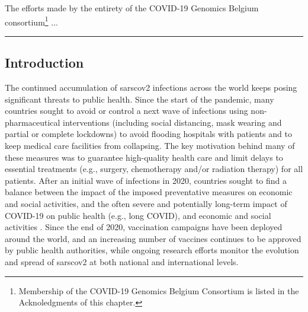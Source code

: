The efforts made by the entirety of the COVID-19 Genomics Belgium consortium\footnote{Membership of the COVID-19 Genomics Belgium Consortium is listed in the Acknoledgments of this chapter.} ...
\vspace*{12pt}
\hrule

\onehalfspacing

\subsection{Introduction}
The continued accumulation of \gls{sarscov2} infections across the world keeps posing significant threats to public health.
Since the start of the pandemic, many countries sought to avoid or control a next wave of infections using non-pharmaceutical interventions (including social distancing, mask wearing and partial or complete lockdowns) to avoid flooding hospitals with patients and to keep medical care facilities from collapsing.
The key motivation behind many of these measures was to guarantee high-quality health care and limit delays to essential treatments (e.g., surgery, chemotherapy and/or radiation therapy) for all patients.
After an initial wave of infections in 2020, countries sought to find a balance between the impact of the imposed preventative measures on economic and social activities, and the often severe and potentially long-term impact of COVID-19 on public health (e.g., long COVID), and economic and social activities \citep{zivin2020spread}.
Since the end of 2020, vaccination campaigns have been deployed around the world, and an increasing number of vaccines continues to be approved by public health authorities, while ongoing research efforts monitor the evolution and spread of \gls{sarscov2} at both national and international levels.

